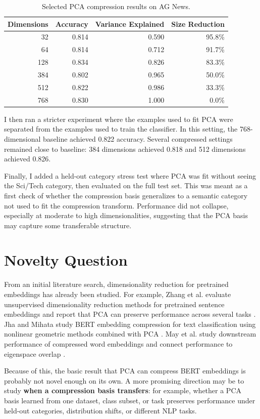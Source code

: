 \documentclass[11pt]{article}
\begin{document}
\begin{table}[h]
\centering
\small
\begin{tabular}{rrrr}
\toprule
Dimensions & Accuracy & Variance Explained & Size Reduction \\
\midrule
32  & 0.814 & 0.590 & 95.8\% \\
64  & 0.814 & 0.712 & 91.7\% \\
128 & 0.834 & 0.826 & 83.3\% \\
384 & 0.802 & 0.965 & 50.0\% \\
512 & 0.822 & 0.986 & 33.3\% \\
768 & 0.830 & 1.000 & 0.0\% \\
\bottomrule
\end{tabular}
\caption{Selected PCA compression results on AG News.}
\end{table}

I then ran a stricter experiment where the examples used to fit PCA were separated from the examples used to train the classifier. In this setting, the 768-dimensional baseline achieved 0.822 accuracy. Several compressed settings remained close to baseline: 384 dimensions achieved 0.818 and 512 dimensions achieved 0.826.

Finally, I added a held-out category stress test where PCA was fit without seeing the Sci/Tech category, then evaluated on the full test set. This was meant as a first check of whether the compression basis generalizes to a semantic category not used to fit the compression transform. Performance did not collapse, especially at moderate to high dimensionalities, suggesting that the PCA basis may capture some transferable structure.

\section{Novelty Question}

From an initial literature search, dimensionality reduction for pretrained embeddings has already been studied. For example, Zhang et al. evaluate unsupervised dimensionality reduction methods for pretrained sentence embeddings and report that PCA can preserve performance across several tasks \cite{zhang2024}. Jha and Mihata study BERT embedding compression for text classification using nonlinear geometric methods combined with PCA \cite{jha2021}. May et al. study downstream performance of compressed word embeddings and connect performance to eigenspace overlap \cite{may2019}.

Because of this, the basic result that PCA can compress BERT embeddings is probably not novel enough on its own. A more promising direction may be to study \textbf{when a compression basis transfers}: for example, whether a PCA basis learned from one dataset, class subset, or task preserves performance under held-out categories, distribution shifts, or different NLP tasks.
\end{document}
